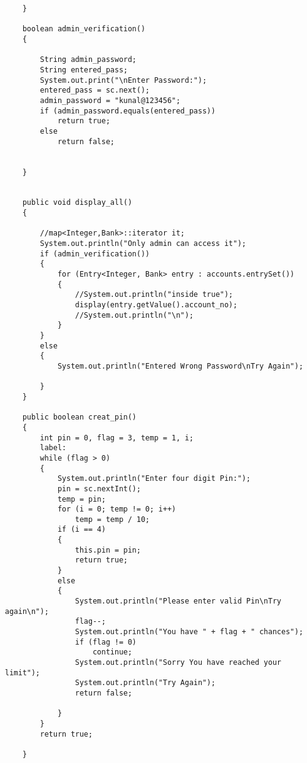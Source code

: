 \documentclass[11pt, a4paper]{article}
\begin{document}
\begin{lstlisting}
    }

    boolean admin_verification()
    {

        String admin_password;
        String entered_pass;
        System.out.print("\nEnter Password:");
        entered_pass = sc.next();
        admin_password = "kunal@123456";
        if (admin_password.equals(entered_pass))
            return true;
        else
            return false;


    }


    public void display_all()
    {

        //map<Integer,Bank>::iterator it;
        System.out.println("Only admin can access it");
        if (admin_verification())
        {
            for (Entry<Integer, Bank> entry : accounts.entrySet())
            {
                //System.out.println("inside true");
                display(entry.getValue().account_no);
                //System.out.println("\n");
            }
        }
        else
        {
            System.out.println("Entered Wrong Password\nTry Again");

        }
    }

    public boolean creat_pin()
    {
        int pin = 0, flag = 3, temp = 1, i;
        label:
        while (flag > 0)
        {
            System.out.println("Enter four digit Pin:");
            pin = sc.nextInt();
            temp = pin;
            for (i = 0; temp != 0; i++)
                temp = temp / 10;
            if (i == 4)
            {
                this.pin = pin;
                return true;
            }
            else
            {
                System.out.println("Please enter valid Pin\nTry again\n");
                flag--;
                System.out.println("You have " + flag + " chances");
                if (flag != 0)
                    continue;
                System.out.println("Sorry You have reached your limit");
                System.out.println("Try Again");
                return false;

            }
        }
        return true;

    }


\end{lstlisting}
\end{document}
